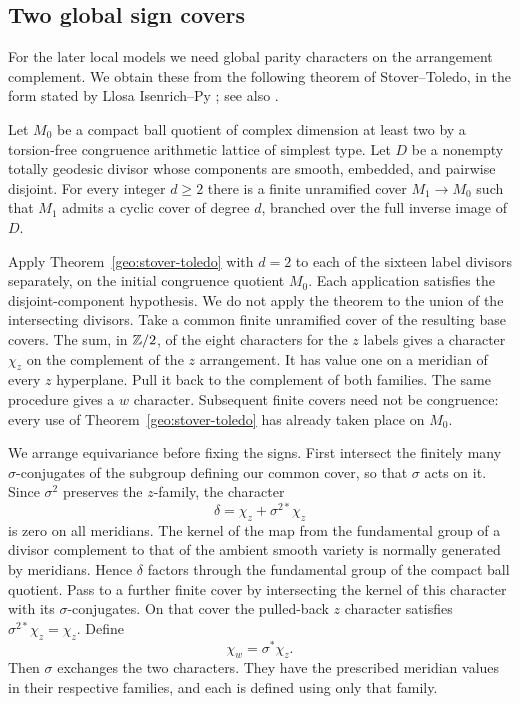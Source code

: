 \subsection{Two global sign covers}\label{geo:signs}

For the later local models we need global parity characters on the
arrangement complement.  We obtain these from the following theorem
of Stover--Toledo, in the form stated by Llosa Isenrich--Py
\cite[Theorem~4.2]{LlosaPy}; see also \cite{StoverToledo}.

\begin{theorem}\label{geo:stover-toledo}
Let $M_0$ be a compact ball quotient of complex dimension at least two
by a torsion-free congruence arithmetic lattice of simplest type.  Let
$D$ be a nonempty totally geodesic divisor whose components are smooth,
embedded, and pairwise disjoint.  For every integer $d\ge2$ there is a
finite unramified cover $M_1\to M_0$ such that $M_1$ admits a cyclic
cover of degree $d$, branched over the full inverse image of $D$.
\end{theorem}

Apply Theorem~\ref{geo:stover-toledo} with $d=2$ to each of the sixteen
label divisors separately, on the initial congruence quotient $M_0$.
Each application satisfies the disjoint-component hypothesis.  We do
not apply the theorem to the union of the intersecting divisors.  Take
a common finite unramified cover of the resulting base covers.  The
sum, in $\mathbb Z/2$, of the eight characters for the $z$ labels gives a
character $\chi_z$ on the complement of the $z$ arrangement.  It has
value one on a meridian of every $z$ hyperplane.  Pull it back to the
complement of both families.  The same procedure gives a $w$ character.
Subsequent finite covers need not be congruence: every use of
Theorem~\ref{geo:stover-toledo} has already taken place on $M_0$.

We arrange equivariance before fixing the signs.  First intersect the
finitely many $\sigma$-conjugates of the subgroup defining our common
cover, so that $\sigma$ acts on it.  Since $\sigma^2$ preserves the
$z$-family, the character
\[
                 \delta=\chi_z+\sigma^{2*}\chi_z
\]
is zero on all meridians.  The kernel of the map from the fundamental
group of a divisor complement to that of the ambient smooth variety
is normally generated by meridians.  Hence $\delta$ factors through
the fundamental group of the compact ball quotient.  Pass to a further
finite cover by intersecting the kernel of this character with its
$\sigma$-conjugates.  On that cover the pulled-back $z$ character
satisfies $\sigma^{2*}\chi_z=\chi_z$.  Define
\begin{equation}\label{geo:sign-equivariance}
                  \chi_w=\sigma^*\chi_z.
\end{equation}
Then $\sigma$ exchanges the two characters.  They have the prescribed
meridian values in their respective families, and each is defined
using only that family.

